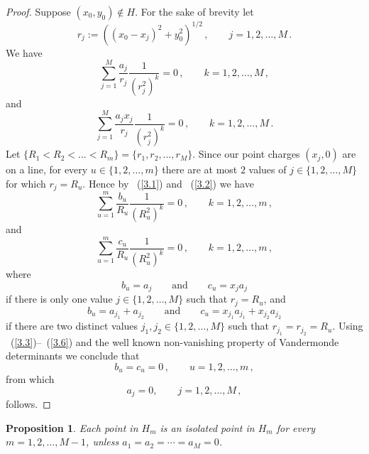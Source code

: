 \documentclass{article}
\newtheorem{prop}[thm]{Proposition}
\theoremstyle{remark}
\numberwithin{equation}{section}
\begin{document}
\begin{proof}
Suppose $(x_0,y_0) \notin H$. For the sake of brevity let
$$r_j := ((x_0-x_j)^2 + y_0^2)^{1/2}\,, \qquad j=1,2,\ldots,M\,.$$
We have
\begin{equation}\label{3.1}
\sum_{j=1}^M{\frac {a_j}{r_j} \frac 1{(r_j^2)^k}} = 0\,, \qquad k = 1,2,\dots,M\,,
\end{equation}
and
\begin{equation}\label{3.2}\sum_{j=1}^M{\frac {a_jx_j}{r_j} \frac 1{(r_j^2)^k}} = 0\,, \qquad k=1,2,\dots,M\,.
\end{equation}
Let $\{R_1 < R_2 < \ldots < R_m\} = \{r_1,r_2,\ldots,r_M\}$.
Since our point charges $(x_j,0)$ are on a line, for every $u \in \{1,2,\ldots,m\}$ there are at most $2$ values of
$j \in \{1,2,\ldots,M\}$ for which $r_j = R_u$. Hence by ~(\ref{3.1}) and ~(\ref{3.2}) we have
\begin{equation}\label{3.3}
\sum_{u=1}^m{\frac{b_u}{R_u} \frac 1{(R_u^2)^k}} = 0\,, \qquad k = 1,2,\dots,m\,,
\end{equation}
and
\begin{equation}\label{3.4}
\sum_{u=1}^m{\frac {c_u}{R_u} \frac 1{(R_u^2)^k}} = 0\,, \qquad k=1,2,\dots,m\,,
\end{equation}
where
\begin{equation}\label{3.5} b_u = a_j \qquad \text{and} \qquad c_u = x_ja_j
\end{equation}
if there is only one value $j \in \{1,2,\ldots,M\}$ such that $r_j = R_u$, and
\begin{equation}\label{3.6}
b_u = a_{j_1} + a_{j_2} \qquad \text{and} \qquad c_u = x_{j_1}a_{j_1} + x_{j_2}a_{j_2}
\end{equation}
if there are two distinct values $j_1, j_2 \in \{1,2,\ldots,M\}$ such that $r_{j_1} = r_{j_2} = R_u$.
Using ~(\ref{3.3})--~(\ref{3.6}) and the well known non-vanishing property of Vandermonde determinants we conclude that
$$b_u = c_u = 0\,, \qquad u=1,2,\ldots,m\,,$$
from which
$$a_j = 0, \qquad j=1,2,\ldots,M\,,$$
follows.
\end{proof}

\begin{prop}\label{countable}
Each point in $H_m$ is an isolated point in $H_m$ for every $m=1,2,\ldots,M-1$, unless $a_1=a_2= \cdots =a_M = 0$.
\end{prop}
\end{document}
